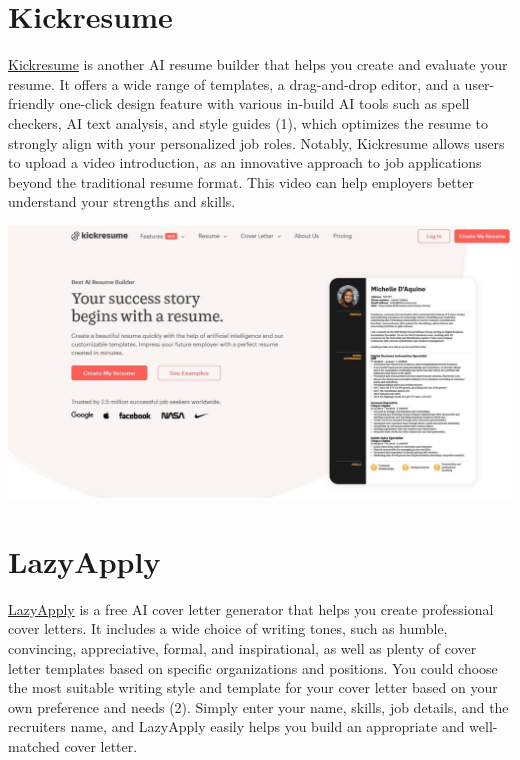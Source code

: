 \documentclass[
]{book}
\begin{document}
\hypertarget{kickresume}{%
\section{Kickresume}\label{kickresume}}

\href{https://www.kickresume.com/en/}{Kickresume} is another AI resume builder that helps you create and evaluate your resume. It offers a wide range of templates, a drag-and-drop editor, and a user-friendly one-click design feature with various in-build AI tools such as spell checkers, AI text analysis, and style guides (1), which optimizes the resume to strongly align with your personalized job roles. Notably, Kickresume allows users to upload a video introduction, as an innovative approach to job applications beyond the traditional resume format. This video can help employers better understand your strengths and skills.~

\includegraphics[width=5.46875in,height=\textheight]{Kickresume pic.png}

\hypertarget{lazyapply}{%
\section{LazyApply}\label{lazyapply}}

\href{https://lazyapply.com/cover-letter-generator}{LazyApply} is a free AI cover letter generator that helps you create professional cover letters. It includes a wide choice of writing tones, such as humble, convincing, appreciative, formal, and inspirational, as well as plenty of cover letter templates based on specific organizations and positions. You could choose the most suitable writing style and template for your cover letter based on your own preference and needs (2). Simply enter your name, skills, job details, and the recruiter\textquotesingle s name, and LazyApply easily helps you build an appropriate and well-matched cover letter.~
\end{document}
